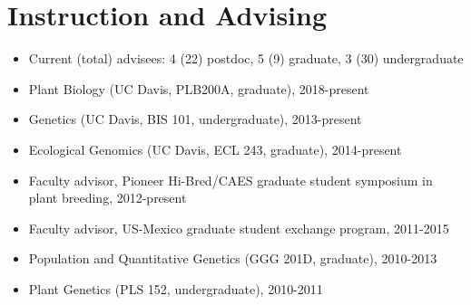 \section*{Instruction and Advising}
\begin{itemize}
\setlength\itemsep{0ex}
\item Current (total) advisees: 4 (22) postdoc, 5 (9) graduate, 3 (30) undergraduate



\item Plant Biology (UC Davis, PLB200A, graduate), 2018-present
\item Genetics (UC Davis, BIS 101, undergraduate), 2013-present
\item Ecological Genomics (UC Davis, ECL  243, graduate), 2014-present
\item Faculty advisor, Pioneer Hi-Bred/CAES graduate student symposium in plant breeding, 2012-present
\item Faculty advisor, US-Mexico graduate student exchange program, 2011-2015
\item Population and Quantitative Genetics (GGG 201D, graduate), 2010-2013 %
\item Plant Genetics (PLS 152, undergraduate), 2010-2011 %

\end{itemize}
